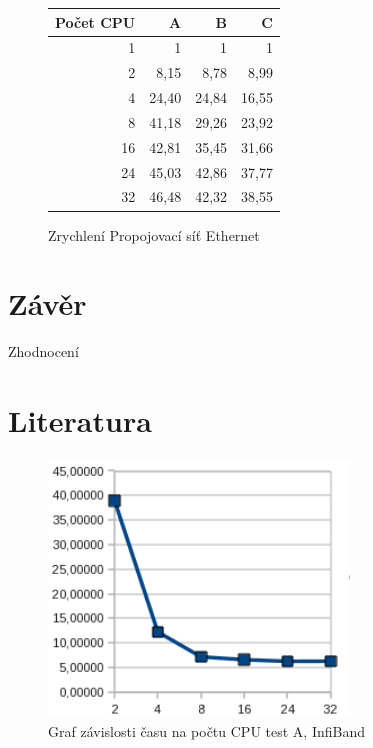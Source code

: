 \documentclass[12pt]{article}
\begin{document}
\begin{figure}
 \caption{Zrychlení Propojovací síť Ethernet}
\begin{tabular}{|r|r|r|r|}
\hline
Počet CPU & A & B & C\\
\hline
1 & 1 & 1 & 1\\
\hline
2 & 8,15 & 8,78 & 8,99\\
\hline
4 & 24,40 & 24,84 & 16,55\\
\hline
8 & 41,18 & 29,26 & 23,92\\
\hline
16 & 42,81 & 35,45 & 31,66\\
\hline
24 & 45,03 & 42,86 & 37,77\\
\hline
32 & 46,48 & 42,32 & 38,55\\
\hline
\end{tabular} 
\end{figure}

\section{Závěr}
Zhodnocení

\section{Literatura}

\appendix
\begin{figure}[ht]
\begin{center}
\includegraphics[width=8cm]{grafy-zprava/testAinfib.png}
\caption{Graf závislosti času na počtu CPU test A, InfiBand}
\label{fig:testAinfib}
\end{center}
\end{figure}
\end{document}
